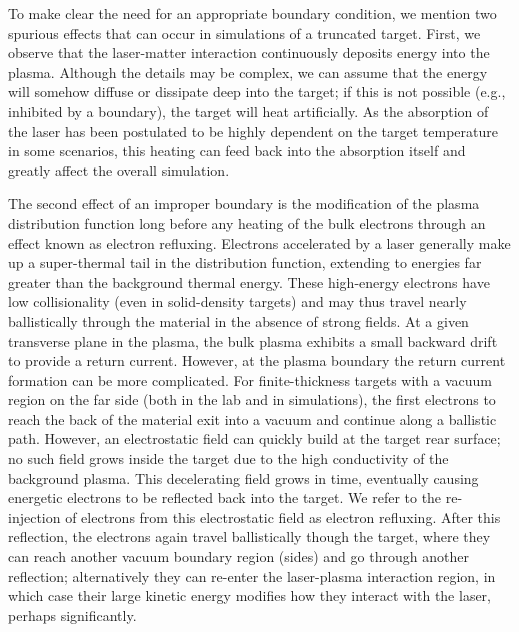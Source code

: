 \documentclass[../absorber.tex]{subfiles}
\begin{document}
To make clear the need for an appropriate boundary condition, we mention two spurious effects that can occur in simulations of a truncated target. First, we observe that the laser-matter interaction continuously deposits energy into the plasma. Although the details may be complex, we can assume that the energy will somehow diffuse or dissipate deep into the target; if this is not possible (e.g., inhibited by a boundary), the target will heat artificially. As the absorption of the laser has been postulated to be highly dependent on the target temperature in some scenarios,\cite{May2011MechanismInterface} this heating can feed back into the absorption itself and greatly affect the overall simulation.

The second effect of an improper boundary is the modification of the plasma distribution function long before any heating of the bulk electrons through an effect known as electron refluxing.\cite{Sentoku2003HighTarget,Quinn2011RefluxingPulses}  Electrons accelerated by a laser generally make up a super-thermal tail in the distribution function, extending to energies far greater than the background thermal energy.\cite{Wilks1992AbsorptionPulses} These high-energy electrons have low collisionality (even in solid-density targets\cite{Nilson2009BulkInteractions}) and may thus travel nearly ballistically through the material in the absence of strong fields. At a given transverse plane in the plasma, the bulk plasma exhibits a small backward drift to provide a return current. However, at the plasma boundary the return current formation can be more complicated. For finite-thickness targets with a vacuum region on the far side (both in the lab and in simulations), the first electrons to reach the back of the material exit into a vacuum and continue along a ballistic path. However, an electrostatic field can quickly build at the target rear surface; no such field grows inside the target due to the high conductivity of the background plasma.  This decelerating field grows in time, eventually causing energetic electrons to be reflected back into the target.  We refer to the re-injection of electrons from this electrostatic field as electron refluxing.  After this reflection, the electrons again travel ballistically though the target, where they can reach another vacuum boundary region (sides) and go through another reflection; alternatively they can re-enter the laser-plasma interaction region, in which case their large kinetic energy modifies how they interact with the laser, perhaps significantly.
\end{document}
